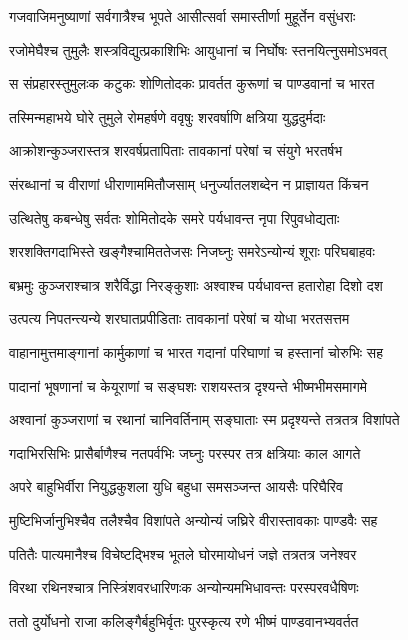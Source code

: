 \twolineshloka
{गजवाजिमनुष्याणां सर्वगात्रैश्च भूपते}
{आसीत्सर्वा समास्तीर्णा मुहूर्तेन वसुंधराः}


\twolineshloka
{रजोमेघैश्च तुमुलैः शस्त्रविद्युत्प्रकाशिभिः}
{आयुधानां च निर्घोषः स्तनयित्नुसमोऽभवत्}


\twolineshloka
{स संप्रहारस्तुमुलःक कटुकः शोणितोदकः}
{प्रावर्तत कुरूणां च पाण्डवानां च भारत}


\twolineshloka
{तस्मिन्महाभये घोरे तुमुले रोमहर्षणे}
{ववृषुः शरवर्षाणि क्षत्रिया युद्धदुर्मदाः}


\twolineshloka
{आक्रोशन्कुञ्जरास्तत्र शरवर्षप्रतापिताः}
{तावकानां परेषां च संयुगे भरतर्षभ}


\twolineshloka
{संरब्धानां च वीराणां धीराणाममितौजसाम्}
{धनुर्ज्यातलशब्देन न प्राज्ञायत किंचन}


\twolineshloka
{उत्थितेषु कबन्धेषु सर्वतः शोमितोदके}
{समरे पर्यधावन्त नृपा रिपुवधोद्यताः}


\twolineshloka
{शरशक्तिगदाभिस्ते खङ्गैश्चामिततेजसः}
{निजघ्नुः समरेऽन्योन्यं शूराः परिघबाहवः}


\twolineshloka
{बभ्रमुः कुञ्जराश्चात्र शरैर्विद्धा निरङ्कुशाः}
{अश्वाश्च पर्यधावन्त हतारोहा दिशो दश}


\twolineshloka
{उत्पत्य निपतन्त्यन्ये शरघातप्रपीडिताः}
{तावकानां परेषां च योधा भरतसत्तम}


\twolineshloka
{वाहानामुत्तमाङ्गानां कार्मुकाणां च भारत}
{गदानां परिघाणां च हस्तानां चोरुभिः सह}


\twolineshloka
{पादानां भूषणानां च केयूराणां च सङ्घशः}
{राशयस्तत्र दृश्यन्ते भीष्मभीमसमागमे}


\twolineshloka
{अश्वानां कुञ्जराणां च रथानां चानिवर्तिनाम्}
{सङ्घाताः स्म प्रदृश्यन्ते तत्रतत्र विशांपते}


\twolineshloka
{गदाभिरसिभिः प्रासैर्बाणैश्च नतपर्वभिः}
{जघ्नुः परस्पर तत्र क्षत्रियाः काल आगते}


\twolineshloka
{अपरे बाहुभिर्वीरा नियुद्धकुशला युधि}
{बहुधा समसञ्जन्त आयसैः परिघैरिव}


\twolineshloka
{मुष्टिभिर्जानुभिश्चैव तलैश्चैव विशांपते}
{अन्योन्यं जघ्रिरे वीरास्तावकाः पाण्डवैः सह}


\twolineshloka
{पतितैः पात्यमानैश्च विचेष्टद्भिश्च भूतले}
{घोरमायोधनं जज्ञे तत्रतत्र जनेश्वर}


\twolineshloka
{विरथा रथिनश्चात्र निस्त्रिंशवरधारिणःक}
{अन्योन्यमभिधावन्तः परस्परवधैषिणः}


\twolineshloka
{ततो दुर्योधनो राजा कलिङ्गैर्बहुभिर्वृतः}
{पुरस्कृत्य रणे भीष्मं पाण्डवानभ्यवर्तत}


